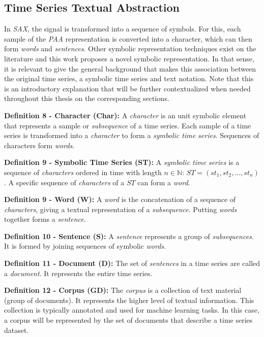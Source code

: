 \subsection{Time Series Textual Abstraction}
\label{subsec:text_abstraction}

In \textit{SAX}, the signal is transformed into a sequence of symbols. For this, each sample of the \textit{PAA} representation is converted into a character, which can then form \textit{words} and \textit{sentences}. Other symbolic representation techniques exist on the literature and this work proposes a novel symbolic representation. In that sense, it is relevant to give the general background that makes this association between the original time series, a symbolic time series and text notation. Note that this is an introductory explanation that will be further contextualized when needed throughout this thesis on the corresponding sections.

\item \textbf{Definition 8 - Character (Char):} A \textit{character} is an unit symbolic element that represents a sample or \textit{subsequence} of a time series. Each sample of a time series is transformed into a \textit{character} to form a \textit{symbolic time series}. Sequences of characters form \textit{words}.

\item \textbf{Definition 9 - Symbolic Time Series (ST):} A \textit{symbolic time series} is a sequence of \textit{characters} ordered in time with length $n \in \mathbb{N}$: $ST = (st_1, st_2, ..., st_n)$. A specific sequence of \textit{characters} of a $ST$ can form a \textit{word}.

\item \textbf{Definition 9 - Word (W):} A \textit{word} is the concatenation of a sequence of \textit{characters}, giving a textual representation of a \textit{subsequence}. Putting \textit{words} together forms a \textit{sentence}.


\item \textbf{Definition 10 - Sentence (S):} A \textit{sentence} represents a group of \textit{subsequences}. It is formed by joining sequences of symbolic \textit{words}.

\item \textbf{Definition 11 - Document (D):} The set of \textit{sentences} in a time series are called a \textit{document}. It represents the entire time series.

\item \textbf{Definition 12 - Corpus (GD):} The \textit{corpus} is a collection of text material (group of documents). It represents the higher level of textual information. This collection is typically annotated and used for machine learning tasks. In this case, a corpus will be represented by the set of documents that describe a time series dataset.

